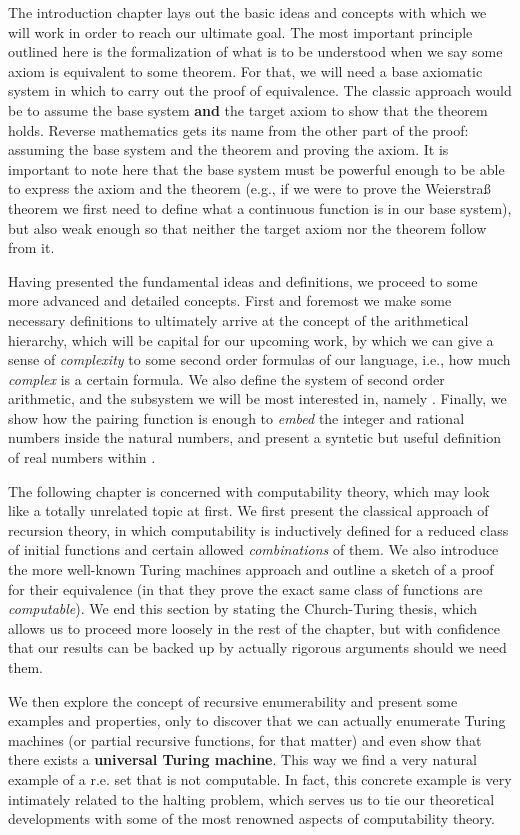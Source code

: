 \documentclass[../main.tex]{memoir}
\begin{document}
The introduction chapter lays out the basic ideas and concepts with which we will work in order to reach our ultimate goal. The most important principle outlined here is the formalization of what is to be understood when we say some axiom is equivalent to some theorem. For that, we will need a base axiomatic system in which to carry out the proof of equivalence. The classic approach would be to assume the base system \textbf{and} the target axiom to show that the theorem holds. Reverse mathematics gets its name from the other part of the proof: assuming the base system and the theorem and proving the axiom. It is important to note here that the base system must be powerful enough to be able to express the axiom and the theorem (e.g., if we were to prove the Weierstra{\ss} theorem we first need to define what a continuous function is in our base system), but also weak enough so that neither the target axiom nor the theorem follow from it.

Having presented the fundamental ideas and definitions, we proceed to some more advanced and detailed concepts. First and foremost we make some necessary definitions to ultimately arrive at the concept of the arithmetical hierarchy, which will be capital for our upcoming work, by which we can give a sense of \textit{complexity} to some second order formulas of our language, i.e., how much \textit{complex} is a certain formula. We also define the system of second order arithmetic, and the subsystem we will be most interested in, namely \rca. Finally, we show how the pairing function is enough to \textit{embed} the integer and rational numbers inside the natural numbers, and present a syntetic but useful definition of real numbers within \rca.

The following chapter is concerned with computability theory, which may look like a totally unrelated topic at first. We first present the classical approach of recursion theory, in which computability is inductively defined for a reduced class of initial functions and certain allowed \textit{combinations} of them. We also introduce the more well-known Turing machines approach and outline a sketch of a proof for their equivalence (in that they prove the exact same class of functions are \textit{computable}). We end this section by stating the Church-Turing thesis, which allows us to proceed more loosely in the rest of the chapter, but with confidence that our results can be backed up by actually rigorous arguments should we need them.

We then explore the concept of recursive enumerability and present some examples and properties, only to discover that we can actually enumerate Turing machines (or partial recursive functions, for that matter) and even show that there exists a \textbf{universal Turing machine}. This way we find a very natural example of a r.e. set that is not computable. In fact, this concrete example is very intimately related to the halting problem, which serves us to tie our theoretical developments with some of the most renowned aspects of computability theory.
\end{document}
